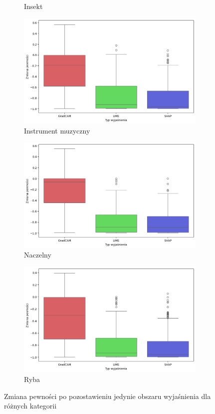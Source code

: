 \begin{figure}[h]
\begin{subfigure}[b]{0.3\textwidth}
		\caption{Insekt}  \label{rys:base_confidence_exp_insect}
	\end{subfigure}
	\begin{subfigure}[b]{0.3\textwidth}
		\centering\includegraphics[width=.9\textwidth]{img/base_confidence_exp_music}
		\caption{Instrument muzyczny}  \label{rys:base_confidence_exp_music}
	\end{subfigure}
	\begin{subfigure}[b]{0.3\textwidth}
		\centering\includegraphics[width=.9\textwidth]{img/base_confidence_exp_primate}
		\caption{Naczelny}  \label{rys:base_confidence_exp_primate}
	\end{subfigure}
	\begin{subfigure}[b]{0.3\textwidth}
		\centering\includegraphics[width=.9\textwidth]{img/base_confidence_exp_fish}
		\caption{Ryba}  \label{rys:base_confidence_exp_fish}
	\end{subfigure}
	\caption{Zmiana pewności po pozostawieniu jedynie obszaru wyjaśnienia dla różnych kategorii}
	\label{rys:base_confidence_exp_category}
\end{figure}

